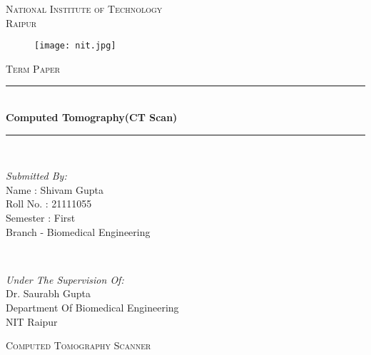 \documentclass[12pt]{article}
\begin{document}
\begin{titlepage}
\newcommand{\HRule}{\rule{\linewidth}{0.5mm}}
\center
\textsc{ \huge National Institute of Technology \\ \vspace{3mm} Raipur}\\[0.8cm]
\begin{figure}[h]
\centering
\texttt{[image: nit.jpg]}
\end{figure}

\centering


\vspace{5mm}
\textsc{\huge Term Paper}\\[0.5cm]
\vspace{5mm}
	\HRule\\[0.4cm]
	{\huge\bfseries Computed Tomography(CT Scan) }\\[0.1cm]
	\HRule\\[1.5cm]
	

	\begin{minipage}{0.4\textwidth}
		\begin{flushleft}
			\Large
			\textit{Submitted By:}\\
          		Name : Shivam Gupta \\
			   Roll No. : 21111055\\
			   Semester : First\\
			   Branch - Biomedical Engineering 
			   
			\end{flushleft}
	\end{minipage}
	~
	\begin{minipage}{0.5\textwidth}
		\begin{flushright}
			\Large
			\textit{Under The Supervision Of:}\\
			Dr. Saurabh Gupta\\
			Department Of Biomedical Engineering\\
			NIT Raipur
		\end{flushright}
	\end{minipage}
	\vfill\vfill\vfill 
	
	
	\vfill 
\end{titlepage}



\clearpage
\newpage

\textsc{\huge Computed Tomography Scanner }\\[0.3cm]
\end{document}
